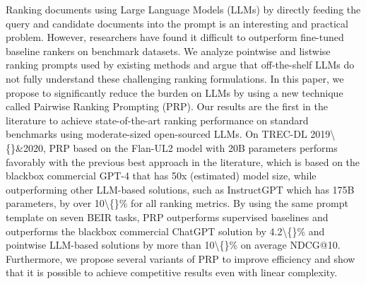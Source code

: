 Ranking documents using Large Language Models (LLMs) by directly feeding the query and candidate documents into the prompt is an interesting and practical problem. However,  researchers have found it difficult to outperform fine-tuned baseline rankers on benchmark datasets. We analyze pointwise and listwise ranking prompts used by existing methods and argue that off-the-shelf LLMs do not fully understand these challenging ranking formulations. In this paper, we propose to significantly reduce the burden on LLMs by using a new technique called Pairwise Ranking Prompting (PRP). Our results are the first in the literature to achieve state-of-the-art ranking performance on standard benchmarks using moderate-sized open-sourced LLMs. On TREC-DL 2019\textbackslash\{\}\&2020, PRP based on the Flan-UL2 model with 20B parameters performs favorably with the previous best approach in the literature, which is based on the blackbox commercial GPT-4 that has 50x (estimated) model size, while outperforming other LLM-based solutions, such as InstructGPT which has 175B parameters, by over 10\textbackslash\{\}\% for all ranking metrics. By using the same prompt template on seven BEIR tasks, PRP outperforms supervised baselines and outperforms the blackbox commercial ChatGPT solution by 4.2\textbackslash\{\}\% and pointwise LLM-based solutions by more than 10\textbackslash\{\}\% on average NDCG@10. Furthermore, we propose several variants of PRP to improve efficiency and show that it is possible to achieve competitive results even with linear complexity.